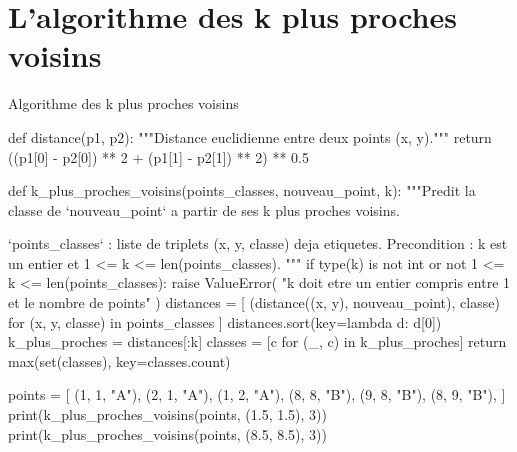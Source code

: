 \section{L'algorithme des k plus proches voisins}




\begin{codereference}{Algorithme des k plus proches voisins}
\begin{python}
def distance(p1, p2):
    """Distance euclidienne entre deux points (x, y)."""
    return ((p1[0] - p2[0]) ** 2 + (p1[1] - p2[1]) ** 2) ** 0.5


def k_plus_proches_voisins(points_classes, nouveau_point, k):
    """Predit la classe de `nouveau_point` a partir de ses k plus proches voisins.

    `points_classes` : liste de triplets (x, y, classe) deja etiquetes.
    Precondition : k est un entier et 1 <= k <= len(points_classes).
    """
    if type(k) is not int or not 1 <= k <= len(points_classes):
        raise ValueError(
            "k doit etre un entier compris entre 1 et le nombre de points"
        )
    distances = [
        (distance((x, y), nouveau_point), classe)
        for (x, y, classe) in points_classes
    ]
    distances.sort(key=lambda d: d[0])
    k_plus_proches = distances[:k]
    classes = [c for (_, c) in k_plus_proches]
    return max(set(classes), key=classes.count)


points = [
    (1, 1, "A"), (2, 1, "A"), (1, 2, "A"),
    (8, 8, "B"), (9, 8, "B"), (8, 9, "B"),
]
print(k_plus_proches_voisins(points, (1.5, 1.5), 3))
print(k_plus_proches_voisins(points, (8.5, 8.5), 3))
\end{python}
\end{codereference}

